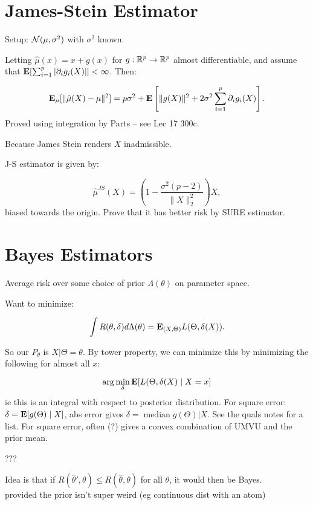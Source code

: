 \documentclass{article}
\begin{document}
\section{James-Stein Estimator}
Setup: $\mathcal N(\mu,\sigma^2)$ with $\sigma^2$ known. 

\begin{theorem}
Letting $\hat \mu(x) = x+g(x)$ for $g: \mathbb R^p \to \mathbb R^p$ almost differentiable, and assume that $\mathbf{E}[\sum_{i=1}^p |\partial_i g_i (X)|] <\infty$. Then:

$$\mathbf{E}_\mu[\|\hat \mu(X) - \mu\|^2] = p\sigma^2 + \mathbf{E}\left[\|g(X)\|^2 + 2\sigma^2 \sum_{i=1}^p \partial_i g_i(X)\right].$$
Proved using integration by Parts -- see Lec 17 300c.
\end{theorem}
\begin{fact}
Because James Stein renders $X$ inadmissible. 	
\end{fact}

J-S estimator is given by:

$$\hat \mu^{JS} (X) = \left ( 1-\frac{\sigma^2(p-2)}{\|X\|_2^2}\right)X,$$
biased towards the origin. Prove that it has better risk by SURE estimator. 

\section{Bayes Estimators}
Average risk over some choice of prior $\Lambda(\theta)$ on parameter space. 

Want to minimize:

$$\int R(\theta, \delta) d\Lambda(\theta) = \mathbf{E}_{(X,\Theta)} L(\Theta, \delta(X)).$$

So our $P_\theta$ is $X|\Theta = \theta$. By tower property, we can minimize this by minimizing the following for almost all $x$:

$$\arg \min_{\delta} \mathbf{E} [L(\Theta, \delta(X) \mid X= x]$$
ie this is an integral with respect to posterior distribution. For square error: $\delta = \mathbf{E}[g(\Theta)\mid X]$, abs error gives $\delta = \operatorname{median} g(\Theta) |X$. See the quals notes for a list. For square error, often (?) gives a convex combination of UMVU and the prior mean. 
\begin{theorem}
???
\end{theorem}
\begin{fact}
Idea is that if $R(\hat \theta ' ,\theta) \leq R(\hat \theta , \theta)$ for all $\theta$, it would then be Bayes. \\ provided the prior isn't super weird (eg continuous dist with an atom) 

\end{fact}
\end{document}
